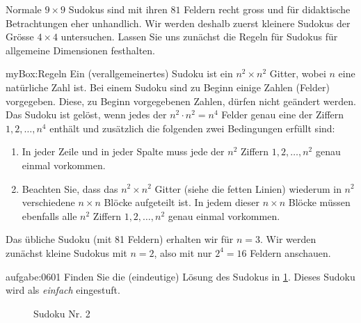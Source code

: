 \noindent
Normale $9\times 9$ Sudokus sind mit ihren $81$ Feldern recht gross und für didaktische Betrachtungen eher unhandlich. Wir werden deshalb zuerst kleinere Sudokus der Grösse $4\times 4$ untersuchen. Lassen Sie uns zunächst die Regeln für Sudokus für allgemeine Dimensionen festhalten.
\begin{myBox}{myBox:Regeln}
Ein (verallgemeinertes) Sudoku ist ein $n^2 \times n^2$ Gitter, wobei $n$ eine natürliche Zahl ist. Bei einem Sudoku sind zu Beginn einige Zahlen (Felder) vorgegeben. Diese, zu Beginn vorgegebenen Zahlen, dürfen nicht geändert werden. Das Sudoku ist gelöst, wenn jedes der $n^2\cdot n^2 = n^4$ Felder genau eine der Ziffern $1,2,\ldots, n^4$ enthält und zusätzlich die folgenden zwei Bedingungen erfüllt sind:
    \begin{enumerate}
    \item In jeder Zeile und in jeder Spalte muss jede der $n^2$ Ziffern $1,2,\ldots, n^2$ genau einmal vorkommen.
    \item Beachten Sie, dass das $n^2\times n^2$ Gitter (siehe die fetten Linien) wiederum in $n^2$ verschiedene $n\times n$ Blöcke aufgeteilt ist. In jedem dieser $n\times n$ Blöcke müssen ebenfalls alle $n^2$ Ziffern $1,2,\ldots, n^2$ genau einmal vorkommen.
\end{enumerate}
\end{myBox}
Das übliche Sudoku (mit 81 Feldern) erhalten wir für $n=3$. Wir werden zunächst kleine Sudokus mit $n=2$, also mit nur $2^4 = 16$ Feldern anschauen.

\begin{aufgabe}{aufgabe:0601}
  Finden Sie die (eindeutige) Lösung des Sudokus in \cref{fig:sudoku2}. Dieses Sudoku wird als \textit{einfach} eingestuft.
  \begin{figure}[H]
      \centering
      \caption{Sudoku Nr. 2}
      \label{fig:sudoku2}
  \end{figure}
  \end{aufgabe}
  
